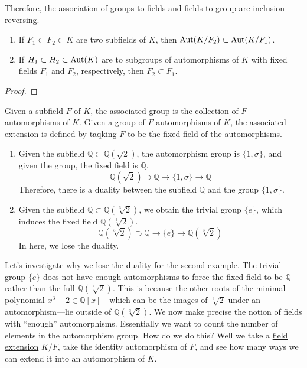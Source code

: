   \begin{theorem}
    \label{thm:inclusion-reversing-association-between-groups}
    Therefore, the association of groups to fields and fields to group are inclusion reversing. 
    \begin{enumerate}
      \item If $F_1 \subset F_2 \subset K$ are two subfields of $K$, then $\operatorname{Aut}(K/F_2) \subset \operatorname{Aut}(K/F_1)$. 
      \item If $H_1 \subset H_2 \subset \operatorname{Aut}(K)$ are to subgroups of automorphisms of $K$ with fixed fields $F_1$ and $F_2$, respectively, then $F_2 \subset F_1$. 
    \end{enumerate}
  \end{theorem}
  \begin{proof}
    
  \end{proof}

  Given a subfield $F$ of $K$, the associated group is the collection of $F$-automorphisms of $K$. Given a group of $F$-automorphisms of $K$, the associated extension is defined by taqking $F$ to be the fixed field of the automorphisms. 
  \begin{enumerate}
    \item Given the subfield $\mathbb{Q} \subset \mathbb{Q}(\sqrt{2})$, the automorphism group is $\{1, \sigma\}$, and given the group, the fixed field is $\mathbb{Q}$. 
      \begin{equation}
        \mathbb{Q}(\sqrt{2}) \supset \mathbb{Q} \to \{1, \sigma\} \to \mathbb{Q}
      \end{equation}
      Therefore, there is a duality between the subfield $\mathbb{Q}$ and the group $\{1, \sigma\}$. 

    \item Given the subfield $\mathbb{Q} \subset \mathbb{Q}(\sqrt[3]{2})$, we obtain the trivial group $\{e\}$, which induces the fixed field $\mathbb{Q}(\sqrt[3]{2})$. 
      \begin{equation}
        \mathbb{Q}(\sqrt[3]{2}) \supset \mathbb{Q} \to \{e\} \to \mathbb{Q}(\sqrt[3]{2})
      \end{equation}
      In here, we lose the duality. 
  \end{enumerate}

  Let's investigate why we lose the duality for the second example. The trivial group $\{e\}$ does not have enough automorphisms to force the fixed field to be $\mathbb{Q}$ rather than the full $\mathbb{Q}(\sqrt[3]{2})$. This is because the other roots of the \hyperref[def:min_poly]{minimal polynomial} $x^3 - 2 \in \mathbb{Q}[x]$---which can be the images of $\sqrt[3]{2}$ under an automorphism---lie outside of $\mathbb{Q}(\sqrt[3]{2})$. We now make precise the notion of fields with ``enough'' automorphisms. Essentially we want to count the number of elements in the automorphism group. How do we do this? Well we take a \hyperref[def:field-extension]{field extension} $K/F$, take the identity automorphism of $F$, and see how many ways we can extend it into an automorphism of $K$. 

